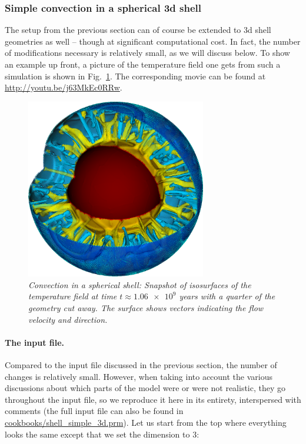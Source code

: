 \documentclass{article}
\begin{document}
\subsubsection{Simple convection in a spherical 3d shell}
\label{sec:shell-simple-3d}

The setup from the previous section can of course be extended to 3d shell
geometries as well -- though at significant computational cost. In fact, the
number of modifications necessary is relatively small, as we will discuss below.
To show an example up front, a picture of the temperature field one gets from
such a simulation is shown in Fig.~\ref{fig:simple-shell-3d}. The
corresponding movie can be found at \url{http://youtu.be/j63MkEc0RRw}.

\begin{figure}[tb]
\centering
\includegraphics[width=0.7\textwidth]{cookbooks/shell_simple_3d/doc/x-movie0700.png}
\caption{\it Convection in a spherical shell: Snapshot of
isosurfaces of the temperature field at time $t\approx \num{1.06e9}$ years
with a quarter of the geometry cut away. The surface shows
vectors indicating the flow velocity and direction.}
\label{fig:simple-shell-3d}
\end{figure}

\paragraph{The input file.}
Compared to the input file discussed in the previous section, the number of
changes is relatively small. However, when taking into account the various
discussions about which parts of the model were or were not realistic, they go
throughout the input file, so we reproduce it here in its entirety, interspersed
with comments (the full input file can also be found in
\url{cookbooks/shell_simple_3d.prm}). Let us start from the top where everything
looks the same except that we set the dimension to 3:
\end{document}
